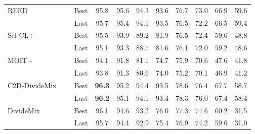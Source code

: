 \documentclass[10pt,twocolumn,letterpaper]{article}
\newcommand{\red}[1]{{#1}}
\begin{document}
\begin{table*}[!t]
{\begin{tabular}{l c c |c|c|c|c||c|c|c|c}
        \multirow{2}{*}{REED~\cite{zhang2020decoupling}}        &               & Best & 95.8 & 95.6 & 94.3 & 93.6 & 76.7 & 73.0 & 66.9 & {59.6} \\
                                                                            & \red{\multirow{-2}{*}{\XSolidBrush}}   & Last & 95.7 & 95.4 & 94.1 & 93.5 & 76.5 & 72.2 & 66.5 & 59.4 \\  \midrule
                                                                               




        \multirow{2}{*}{Sel-CL+~\cite{li2022selective}}         &             & Best & 95.5 & 93.9 & 89.2& 81.9 & 76.5 & 72.4 & 59.6 & {48.8} \\
                                                                         &   \red{\multirow{-2}{*}{\XSolidBrush}}     & Last & 95.1 & 93.3 & 88.7 & 81.6 & 76.1 & 72.0 & 59.2 & 48.6 \\  \midrule


        \multirow{2}{*}{MOIT+~\cite{ortego2021multi}}                  &     & Best & 94.1 & 91.8 & 81.1 & 74.7 & 75.9 & 70.6 & 47.6 & {41.8} \\
                                                                       &      \red{\multirow{-2}{*}{\XSolidBrush}}   & Last & 93.8 & 91.3 & 80.6 & 74.0 & 75.2 & 70.1 & 46.9 & 41.2 \\  \midrule    
        \multirow{2}{*}{C2D-DivideMix~\cite{zheltonozhskii2022contrast}}                       & & Best & \textbf{96.3} & 95.2 & 94.4 & 93.5 & 78.6 & 76.4 & 67.7 & {58.7} \\
                                                                           &  \red{\multirow{-2}{*}{\XSolidBrush}}  & Last & \textbf{96.2} & 95.1 & 94.1 & 93.4 & 78.3 & 76.0 & 67.4 & 58.4 \\  \midrule
                                                                               
        \multirow{2}{*}{DivideMix~\cite{li2020dividemix}}  &        & Best & {96.1} &     {94.6}      &     {93.2}      &     76.0     &       {77.3}       &       {74.6}       &     60.2      &     31.5      \\
                                                                     &     \red{\multirow{-2}{*}{\XSolidBrush} }      & Last & {95.7} &     {94.4}      &     {92.9}      &     75.4     &       {76.9}       &       {74.2}       &     59.6      &     31.0      \\ \midrule
\midrule
   

\end{tabular}}
\end{table*}
\end{document}
